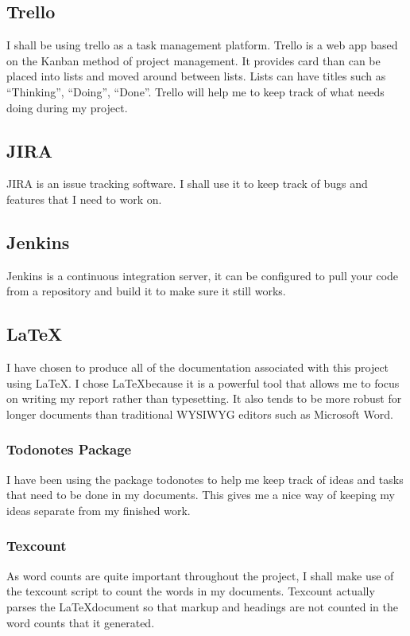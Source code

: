 \documentclass[12pt]{report}
\begin{document}
\subsection{Trello}
I shall be using trello as a task management platform. Trello is a web app based 
on the Kanban method of project management. It provides card than can be placed
into lists and moved around between lists. Lists can have titles such as
``Thinking'', ``Doing'', ``Done''. Trello will help me to keep track of what
needs doing during my project.

\subsection{JIRA}
JIRA is an issue tracking software. I shall use it to keep track of bugs and
features that I need to work on. 

\subsection{Jenkins}
Jenkins is a continuous integration server, it can be configured to pull your
code from a repository and build it to make sure it still works.  

\subsection{\LaTeX}
I have chosen to produce all of the documentation associated with this project
using \LaTeX. I chose \LaTeX because it is a powerful tool that allows me to
focus on writing my report rather than typesetting. It also tends to be more
robust for longer documents than traditional WYSIWYG editors such as Microsoft
Word.

\subsubsection{Todonotes Package}
I have been using the package todonotes to help me keep track of ideas and tasks 
that need to be done in my documents. This gives me a nice way of keeping my
ideas separate from my finished work.

\subsubsection{Texcount}
As word counts are quite important throughout the project, I shall make use of
the texcount script to count the words in my documents. Texcount actually parses
the \LaTeX document so that markup and headings are not counted in the word
counts that it generated. 
\end{document}
